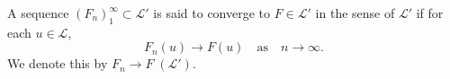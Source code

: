 A sequence $(F_n)_{1}^{\infty} \subset \mathcal{L}'$ is said to converge to $F \in \mathcal{L}'$ in the sense of $\mathcal{L}'$ if for each $u \in \mathcal{L}$,
$$F_n(u) \rightarrow F(u) \quad \text{as} \quad n \rightarrow \infty.$$
We denote this by $F_n \rightarrow F \; (\mathcal{L}')$.
